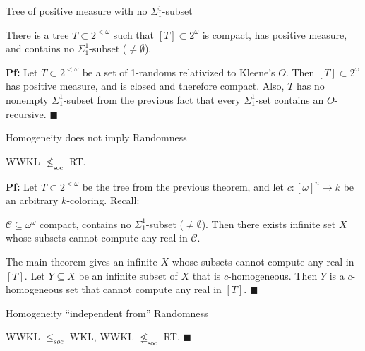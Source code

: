 \begin{frame}{Tree of positive measure with no $\Sigma_1^1$-subset}
  \begin{thm}
    There is a tree $T\subset2^{<\omega}$ such that $[T]\subset
    2^\omega$ is compact, has positive measure, and contains no
    $\Sigma_1^1$-subset ($\neq\emptyset$).
  \end{thm}

  \vspace{2em}
  \textbf{Pf:} Let $T\subset2^{<\omega}$ be a set of 1-randoms
  relativized to Kleene's $O$. Then $[T]\subset 2^\omega$ has positive
  measure, and is closed and therefore compact. Also, $T$ has no nonempty
  $\Sigma_1^1$-subset from the previous fact that every $\Sigma^1_1$-set
  contains an $O$-recursive. $\blacksquare$
\end{frame}

\begin{frame}{Homogeneity does not imply Randomness}
  \begin{theorem}
    WWKL $\nleq_{\text{soc}}$ RT.
  \end{theorem}

  \vspace{1em}
  \textbf{Pf:} Let $T\subset2^{<\omega}$ be the tree from the previous
  theorem, and let $c:[\omega]^n\rightarrow k$ be an arbitrary
  $k$-coloring. Recall:
  \begin{main-thm*}
    $\mathcal{C}\subseteq\omega^\omega$ compact, contains no
    $\Sigma_1^1$-subset ($\neq\emptyset$). Then there exists infinite set
    $X$ whose subsets cannot compute any real in $\mathcal{C}$.
  \end{main-thm*}

  \vspace{1em}
  The main theorem gives an infinite $X$ whose subsets cannot compute any
  real in $[T]$. Let $Y\subseteq X$ be an infinite subset of $X$ that is
  $c$-homogeneous. Then $Y$ is a $c$-homogeneous set that cannot compute
  any real in $[T]$. $\blacksquare$
\end{frame}

\begin{frame}{Homogeneity ``independent from'' Randomness}
  \begin{coro}
    WWKL $\leq_{soc}$ WKL, WWKL $\nleq_{\text{soc}}$ RT. $\blacksquare$
  \end{coro}

  \vspace{2em}
  \begin{center}
  \end{center}
\end{frame}
